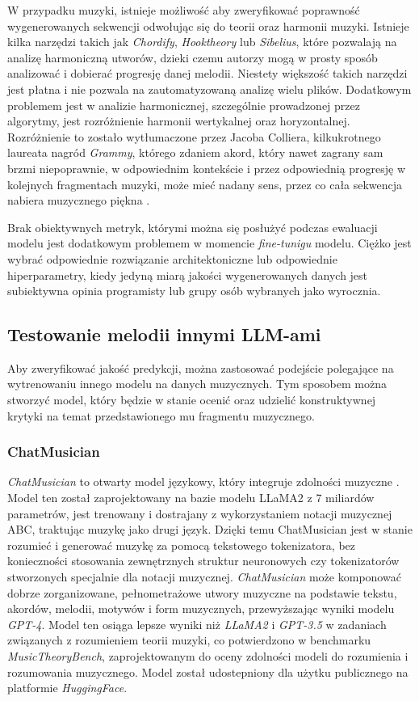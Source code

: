 \documentclass[data-science]{agh-wi} %
\begin{document}
W przypadku muzyki, istnieje możliwość aby zweryfikować poprawność wygenerowanych sekwencji odwołując się do teorii oraz harmonii muzyki. Istnieje kilka narzędzi takich jak \textit{Chordify}, \textit{Hooktheory} lub \textit{Sibelius}, które pozwalają na analizę harmoniczną utworów, dzieki czemu autorzy mogą w prosty sposób analizować i dobierać progresję danej melodii. Niestety większość takich narzędzi jest płatna i nie pozwala na zautomatyzowaną analizę wielu plików. Dodatkowym problemem jest w analizie harmonicznej, szczególnie prowadzonej przez algorytmy, jest rozróżnienie harmonii wertykalnej oraz horyzontalnej. Rozróżnienie to zostało wytłumaczone przez Jacoba Colliera, kilkukrotnego laureata nagród \textit{Grammy}, którego zdaniem akord, który nawet zagrany sam brzmi niepoprawnie, w odpowiednim kontekście i przez odpowiednią progresję w kolejnych fragmentach muzyki, może mieć nadany sens, przez co cała sekwencja nabiera muzycznego piękna \cite{collier_wrongnote}.

Brak obiektywnych metryk, którymi można się posłużyć podczas ewaluacji modelu jest dodatkowym problemem w momencie \textit{fine-tunigu} modelu. Ciężko jest wybrać odpowiednie rozwiązanie architektoniczne lub odpowiednie hiperparametry, kiedy jedyną miarą jakości wygenerowanych danych jest subiektywna opinia programisty lub grupy osób wybranych jako wyrocznia.

\subsection{Testowanie melodii innymi LLM-ami}
Aby zweryfikować jakość predykcji, można zastosować podejście polegające na wytrenowaniu innego modelu na danych muzycznych. Tym sposobem można stworzyć model, który będzie w stanie ocenić oraz udzielić konstruktywnej krytyki na temat przedstawionego mu fragmentu muzycznego.
\subsubsection*{ChatMusician}
\textit{ChatMusician} to otwarty model językowy, który integruje zdolności muzyczne \cite{yuan2024chatmusician}. Model ten został zaprojektowany na bazie modelu LLaMA2 z 7 miliardów parametrów, jest trenowany i dostrajany z wykorzystaniem notacji muzycznej ABC, traktując muzykę jako drugi język. Dzięki temu ChatMusician jest w stanie rozumieć i generować muzykę za pomocą tekstowego tokenizatora, bez konieczności stosowania zewnętrznych struktur neuronowych czy tokenizatorów stworzonych specjalnie dla notacji muzycznej. \textit{ChatMusician} może komponować dobrze zorganizowane, pełnometrażowe utwory muzyczne na podstawie tekstu, akordów, melodii, motywów i form muzycznych, przewyższając wyniki modelu \textit{GPT-4}. Model ten osiąga lepsze wyniki niż \textit{LLaMA2} i \textit{GPT-3.5} w zadaniach związanych z rozumieniem teorii muzyki, co potwierdzono w benchmarku \textit{MusicTheoryBench}, zaprojektowanym do oceny zdolności modeli do rozumienia i rozumowania muzycznego. Model został udostepniony dla użytku publicznego na platformie \textit{HuggingFace}.
\end{document}
